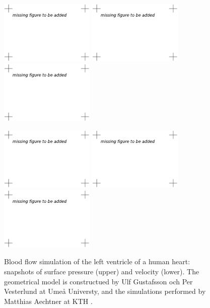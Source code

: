 \begin{figure}[bhpt]

\centerline{
\includegraphics[width=4.5cm]{chapters/hoffman-1/pdf/pressure_animation-0020.pdf}
\includegraphics[width=4.5cm]{chapters/hoffman-1/pdf/pressure_animation-0064.pdf}
\includegraphics[width=4.5cm]{chapters/hoffman-1/pdf/pressure_animation-0135.pdf}
}

\centerline{
\includegraphics[width=4.5cm]{chapters/hoffman-1/pdf/velocity_animation-0020.pdf}
\includegraphics[width=4.5cm]{chapters/hoffman-1/pdf/velocity_animation-0064.pdf}
\includegraphics[width=4.5cm]{chapters/hoffman-1/pdf/velocity_animation-0135.pdf}
}
\caption{Blood flow simulation of the left ventricle of a human heart: snapshots of surface pressure (upper) and velocity (lower).
The geometrical model is constructued by Ulf Gustafsson och Per Vesterlund at Ume{\aa} Universty, and the simulations
performed by Matthias Aechtner at KTH \cite{Aechtner2009}.}
\label{fig:heart}
\end{figure}


